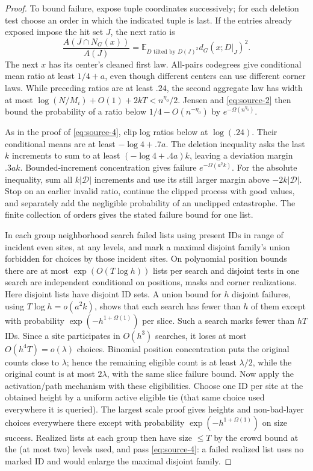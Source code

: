 \begin{proof}
To bound failure, expose tuple coordinates successively; for each deletion test choose an order in which the indicated tuple is last. If the entries already exposed impose the hit set \(J\), the next ratio is
\[
 \frac{A(J\cap N_G(x))}{A(J)}
   =\mathbb E_{D\text{ tilted by }D(J)^2}d_G(x;D|_J)^2.
\]
The next \(x\) has its center's cleaned first law. All-pairs codegrees give conditional mean ratio at least \(1/4+a\), even though different centers can use different corner laws. While preceding ratios are at least \(.24\), the second aggregate law has width at most
\(\log(N/M_i)+O(1)+2kT<n^{\eta_0}/2\).
Jensen and \eqref{eq:source-2} then bound the probability of a ratio below \(1/4-O(n^{-\eta_0})\) by \(e^{-\Omega(n^{\eta_0})}\).

As in the proof of \eqref{eq:source-4}, clip log ratios below at \(\log(.24)\). Their conditional means are at least \(-\log4+.7a\). The deletion inequality asks the last \(k\) increments to sum to at least \((-\log4+.4a)k\), leaving a deviation margin \(.3ak\). Bounded-increment concentration gives failure \(e^{-\Omega(a^2k)}\). For the absolute inequality, sum all \(k|\mathcal D|\) increments and use its still larger margin above \(-2k|\mathcal D|\). Stop on an earlier invalid ratio, continue the clipped process with good values, and separately add the negligible probability of an unclipped catastrophe. The finite collection of orders gives the stated failure bound for one list.

In each group neighborhood search failed lists using present IDs in range of incident even sites, at any levels, and mark a maximal disjoint family's union forbidden for choices by those incident sites. On polynomial position bounds there are at most \(\exp(O(T\log h))\) lists per search and disjoint tests in one search are independent conditional on positions, masks and corner realizations. Here disjoint lists have disjoint ID sets. A union bound for \(h\) disjoint failures, using \(T\log h=o(a^2k)\), shows that each search has fewer than \(h\) of them except with probability \(\exp(-h^{1+\Omega(1)})\) per slice. Such a search marks fewer than \(hT\) IDs. Since a site participates in \(O(h^3)\) searches, it loses at most \(O(h^4T)=o(\lambda)\) choices. Binomial position concentration puts the original counts close to \(\lambda\); hence the remaining eligible count is at least \(\lambda/2\), while the original count is at most \(2\lambda\), with the same slice failure bound. Now apply the activation/path mechanism with these eligibilities. Choose one ID per site at the obtained height by a uniform active eligible tie (that same choice used everywhere it is queried). The largest scale proof gives heights and non-bad-layer choices everywhere there except with probability \(\exp(-h^{1+\Omega(1)})\) on size success. Realized lists at each group then have size \(\le T\) by the crowd bound at the (at most two) levels used, and pass \eqref{eq:source-4}: a failed realized list uses no marked ID and would enlarge the maximal disjoint family.


\end{proof}
